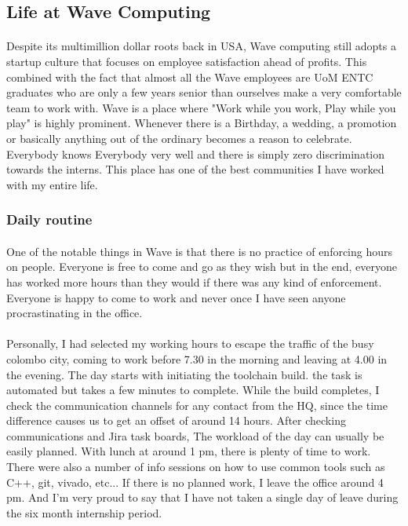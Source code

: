 
\newpage
\subsection{Life at Wave Computing}
\label{sec:wavelife}
\paragraph{}
Despite its multimillion dollar roots back in USA, Wave computing still adopts a startup culture that focuses on employee satisfaction ahead of profits. This combined with the fact that almost all the Wave employees are UoM ENTC graduates who are only a few years senior than ourselves make a very comfortable team to work with. Wave is a place where "Work while you work, Play while you play" is highly prominent. Whenever there is a Birthday, a wedding, a promotion or basically anything out of the ordinary becomes a reason to celebrate. Everybody knows Everybody very well and there is simply zero discrimination towards the interns. This place has one of the best communities I have worked with my entire life.

\subsubsection{Daily routine}
\paragraph{}
One of the notable things in Wave is that there is no practice of enforcing hours on people. Everyone is free to come and go as they wish but in the end, everyone has worked more hours than they would if there was any kind of enforcement. Everyone is happy to come to work and never once I have seen anyone procrastinating in the office. 

\paragraph{}
Personally, I had selected my working hours to escape the traffic of the busy colombo city, coming to work before 7.30 in the morning and leaving at 4.00 in the evening. The day starts with initiating the toolchain build. the task is automated but takes a few minutes to complete. While the build completes, I check the communication channels for any contact from the HQ, since the time difference causes us to get an offset of around 14 hours. After checking communications and Jira task boards, The workload of the day can usually be easily planned. With lunch at around 1 pm, there is plenty of time to work. There were also a number of info sessions on how to use common tools such as C++, git, vivado, etc... If there is no planned work, I leave the office around 4 pm. And I'm very proud to say that I have not taken a single day of leave during the six month internship period.

